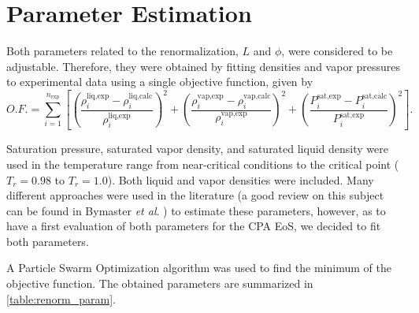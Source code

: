 \documentclass[preprint,12pt,3p]{elsarticle}
\begin{document}
\section{Parameter Estimation}
\label{sec:Parameter Estimation}

Both parameters related to the renormalization, $L$ and $\phi$, were considered to be adjustable.
Therefore, they were obtained by fitting densities and vapor pressures to experimental data using a single objective function, given by
\begin{equation}   \label{eq:OF}
O.F.=\sum_{i=1}^{n_\text{exp}}\left[ \left(\frac{\rho_{i}^\text{liq,exp}-\rho_{i}^\text{liq,calc}}{\rho_{i}^\text{liq,exp}}\right)^2 + \left(\frac{\rho_{i}^\text{vap,exp}-\rho_{i}^\text{vap,calc}}{\rho_{i}^\text{vap,exp}}\right)^2 + \left(\frac{P_{i}^\text{sat,exp}-P_{i}^\text{sat,calc}}{P_{i}^\text{sat,exp}}\right)^2\right].
\end{equation}

Saturation pressure, saturated vapor density, and saturated liquid density were used in the temperature range from near-critical conditions to the critical point ($T_r=0.98$ to $T_r=1.0$).
Both liquid and vapor densities were included.
Many different approaches were used in the literature (a good review on this subject can be found in Bymaster \textit{et al}. \cite{bymaster2008renormalization}) to estimate these parameters, however, as to have a first evaluation of both parameters for the CPA EoS, we decided to fit both parameters.

A Particle Swarm Optimization algorithm was used to find the minimum of the objective function.
The obtained parameters are summarized in \cref{table:renorm_param}.

\begin{table}[ht!]
	\centering
	\caption{Renormalization method parameters estimated using the procedure described in \cref{sec:Parameter Estimation}.}
	\label{table:renorm_param}
\end{table}
\end{document}
